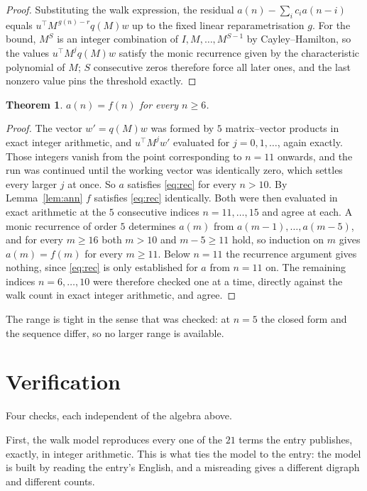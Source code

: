 \documentclass[11pt,a4paper]{article}
\theoremstyle{plain}
\newtheorem{theorem}{Theorem}
\theoremstyle{definition}
\begin{document}
\begin{proof}
Substituting the walk expression, the residual $a(n)-\sum_ic_ia(n-i)$ equals
$u^{\!\top}M^{\,g(n)-r}q(M)w$ up to the fixed linear reparametrisation $g$. For the bound,
$M^{S}$ is an integer combination of $I,M,\dots,M^{S-1}$ by Cayley--Hamilton, so the values
$u^{\!\top}M^{j}q(M)w$ satisfy the monic recurrence given by the characteristic polynomial of
$M$; $S$ consecutive zeros therefore force all later ones, and the last nonzero value pins the
threshold exactly.
\end{proof}

\begin{theorem}
$a(n)=f(n)$ for every $n\ge6$.
\end{theorem}

\begin{proof}
The vector $w'=q(M)w$ was formed by $5$ matrix--vector products in exact integer
arithmetic, and $u^{\!\top}M^{j}w'$ evaluated for $j=0,1,\dots$, again exactly. Those integers
vanish from the point corresponding to $n=11$ onwards, and the run was continued until the
working vector was identically zero, which settles every larger $j$ at once. So $a$ satisfies
\eqref{eq:rec} for every $n>10$. By Lemma~\ref{lem:ann} $f$ satisfies \eqref{eq:rec}
identically. Both were then evaluated in exact arithmetic at the $5$ consecutive indices
$n=11,\dots,15$ and agree at each. A monic recurrence of order $5$
determines $a(m)$ from $a(m-1),\dots,a(m-5)$, and for every $m\ge16$ both
$m>10$ and $m-5\ge11$ hold, so induction on $m$ gives $a(m)=f(m)$ for every
$m\ge11$.
Below $n=11$ the recurrence argument gives nothing, since \eqref{eq:rec} is only
established for $a$ from $n=11$ on. The remaining indices $n=6,\dots,10$ were
therefore checked one at a time, directly against the walk count in exact integer arithmetic,
and agree.
\end{proof}

The range is tight in the sense that was checked: at $n=5$ the closed form and the sequence differ, so no larger range is available.

\section{Verification}

Four checks, each independent of the algebra above.

First, the walk model reproduces every one of the $21$ terms the entry publishes,
exactly, in integer arithmetic. This is what ties the model to the entry: the model is built
by reading the entry's English, and a misreading gives a different digraph and different
counts.
\end{document}
